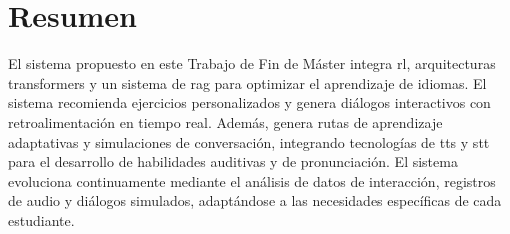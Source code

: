 \chapter*{Resumen}
\label{resumen}


El sistema propuesto en este Trabajo de Fin de Máster integra \gls{rl}, arquitecturas \gls{transformers} y un sistema de \gls{rag} para optimizar el aprendizaje de idiomas. El sistema recomienda ejercicios personalizados y genera diálogos interactivos con retroalimentación en tiempo real. Además, genera rutas de aprendizaje adaptativas y simulaciones de conversación, integrando tecnologías de \gls{tts} y \gls{stt} para el desarrollo de habilidades auditivas y de pronunciación. El sistema evoluciona continuamente mediante el análisis de datos de interacción, registros de audio y diálogos simulados, adaptándose a las necesidades específicas de cada estudiante.
